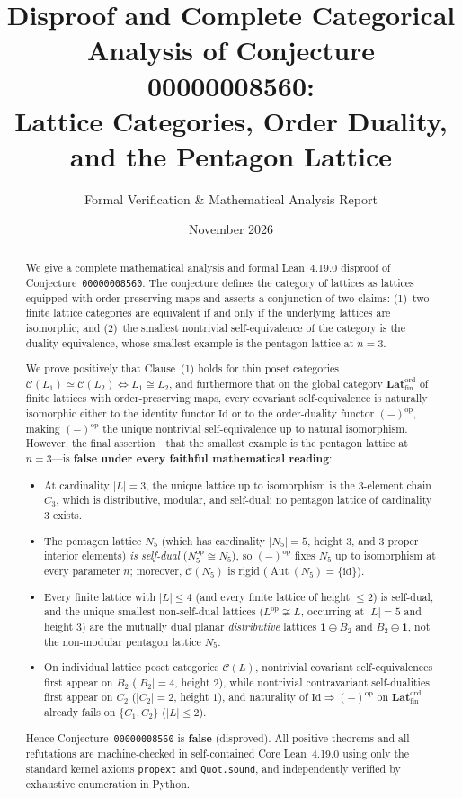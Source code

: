\documentclass[11pt]{article}
\title{\textbf{Disproof and Complete Categorical Analysis of Conjecture 00000008560:\\
Lattice Categories, Order Duality, and the Pentagon Lattice}}
\author{Formal Verification \& Mathematical Analysis Report}
\date{November 2026}
\theoremstyle{definition}
\newcommand{\CatC}{\mathcal{C}}
\newcommand{\FinLatOrd}{\mathbf{Lat}_{\mathrm{fin}}^{\mathrm{ord}}}
\newcommand{\Id}{\mathrm{Id}}
\newcommand{\op}{\mathrm{op}}
\newcommand{\Aut}{\operatorname{Aut}}
\begin{document}
\maketitle

\begin{abstract}
We give a complete mathematical analysis and formal Lean~4.19.0 disproof of
Conjecture~\texttt{00000008560}. The conjecture defines the category of lattices
as lattices equipped with order-preserving maps and asserts a conjunction of two
claims: (1)~two finite lattice categories are equivalent if and only if the
underlying lattices are isomorphic; and (2)~the smallest nontrivial
self-equivalence of the category is the duality equivalence, whose smallest
example is the pentagon lattice at $n = 3$.

We prove positively that Clause~(1) holds for thin poset categories
$\CatC(L_1) \simeq \CatC(L_2) \iff L_1 \cong L_2$, and furthermore that on the
global category $\FinLatOrd$ of finite lattices with order-preserving maps,
every covariant self-equivalence is naturally isomorphic either to the identity
functor $\Id$ or to the order-duality functor $(-)^{\op}$, making $(-)^{\op}$
the unique nontrivial self-equivalence up to natural isomorphism. However, the
final assertion---that the smallest example is the pentagon lattice at
$n = 3$---is \textbf{false under every faithful mathematical reading}:
\begin{itemize}
  \item At cardinality $|L| = 3$, the unique lattice up to isomorphism is the
  $3$-element chain $C_3$, which is distributive, modular, and self-dual; no
  pentagon lattice of cardinality $3$ exists.
  \item The pentagon lattice $N_5$ (which has cardinality $|N_5| = 5$, height
  $3$, and $3$ proper interior elements) \emph{is self-dual}
  ($N_5^{\op} \cong N_5$), so $(-)^{\op}$ fixes $N_5$ up to isomorphism at every
  parameter $n$; moreover, $\CatC(N_5)$ is rigid ($\Aut(N_5) = \{\mathrm{id}\}$).
  \item Every finite lattice with $|L| \le 4$ (and every finite lattice of
  height $\le 2$) is self-dual, and the unique smallest non-self-dual lattices
  ($L^{\op} \not\cong L$, occurring at $|L| = 5$ and height $3$) are the
  mutually dual planar \emph{distributive} lattices $\mathbf{1} \oplus B_2$ and
  $B_2 \oplus \mathbf{1}$, not the non-modular pentagon lattice $N_5$.
  \item On individual lattice poset categories $\CatC(L)$, nontrivial covariant
  self-equivalences first appear on $B_2$ ($|B_2| = 4$, height $2$), while
  nontrivial contravariant self-dualities first appear on $C_2$ ($|C_2| = 2$,
  height $1$), and naturality of $\Id \Rightarrow (-)^{\op}$ on $\FinLatOrd$
  already fails on $\{C_1, C_2\}$ ($|L| \le 2$).
\end{itemize}
Hence Conjecture~\texttt{00000008560} is \textbf{false} (disproved). All
positive theorems and all refutations are machine-checked in self-contained Core
Lean~4.19.0 using only the standard kernel axioms \texttt{propext} and
\texttt{Quot.sound}, and independently verified by exhaustive enumeration in
Python.
\end{abstract}
\end{document}
